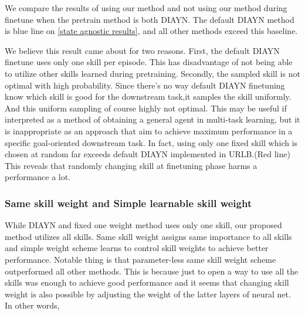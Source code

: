 We compare the results of using our method and not using our method during finetune when the pretrain method is both DIAYN.
The default DIAYN method is blue line on \cref*{state agnostic results}, and all other methods exceed this baseline.

We believe this result came about for two reasons.
First, the default DIAYN finetune uses only one skill per episode.
This has disadvantage of not being able to utilize other skills learned during pretraining.
Secondly, the sampled skill is not optimal with high probability.
Since there's no way default DIAYN finetuning know which skill is good for the downstream task,it samples the skill uniformly.
And this uniform sampling of course highly not optimal.
This may be useful if interpreted as a method of obtaining a general agent in multi-task learning,
but it is inappropriate as an approach that aim to achieve maximum performance in a specific goal-oriented downstream task.
In fact, using only one fixed skill which is chosen at random far exceeds default DIAYN implemented in URLB.(Red line)
This reveals that randomly changing skill at finetuning phase harms a performance a lot.


\subsubsection{Same skill weight and Simple learnable skill weight}
While DIAYN and fixed one weight method uses only one skill, our proposed method utilizes all skills.
Same skill weight assigns same importance to all skills and simple weight scheme learns to control skill weights to achieve better performance.
Notable thing is that parameter-less same skill weight scheme outperformed all other methods.
This is because just to open a way to use all the skills was enough to achieve good performance
and it seems that changing skill weight is also possible by adjusting the weight of the latter layers of neural net.
In other words, 


